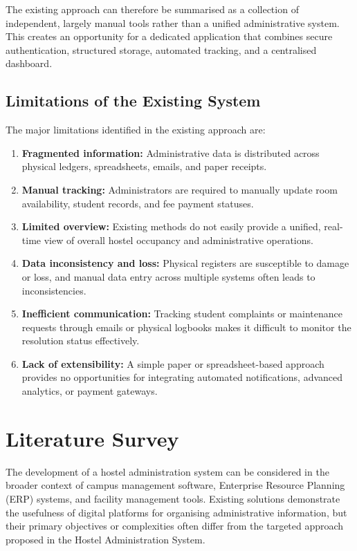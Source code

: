 The existing approach can therefore be summarised as a collection of independent, largely manual tools rather than a unified administrative system. This creates an opportunity for a dedicated application that combines secure authentication, structured storage, automated tracking, and a centralised dashboard.

\subsection{Limitations of the Existing System}

The major limitations identified in the existing approach are:

\begin{enumerate}
    \item \textbf{Fragmented information:} Administrative data is distributed across physical ledgers, spreadsheets, emails, and paper receipts.
    
    \item \textbf{Manual tracking:} Administrators are required to manually update room availability, student records, and fee payment statuses.
    
    \item \textbf{Limited overview:} Existing methods do not easily provide a unified, real-time view of overall hostel occupancy and administrative operations.
    
    \item \textbf{Data inconsistency and loss:} Physical registers are susceptible to damage or loss, and manual data entry across multiple systems often leads to inconsistencies.
    
    \item \textbf{Inefficient communication:} Tracking student complaints or maintenance requests through emails or physical logbooks makes it difficult to monitor the resolution status effectively.
    
    \item \textbf{Lack of extensibility:} A simple paper or spreadsheet-based approach provides no opportunities for integrating automated notifications, advanced analytics, or payment gateways.
\end{enumerate}

\section{Literature Survey}

The development of a hostel administration system can be considered in the broader context of campus management software, Enterprise Resource Planning (ERP) systems, and facility management tools. Existing solutions demonstrate the usefulness of digital platforms for organising administrative information, but their primary objectives or complexities often differ from the targeted approach proposed in the Hostel Administration System.

